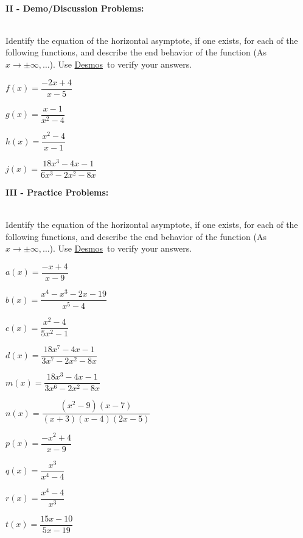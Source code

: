 \documentclass[12pt]{article}
\theoremstyle{definition}
\newcommand{\Desmos}{\href{https://www.desmos.com/}{Desmos}}
\begin{document}
\ \par
{\bf II - Demo/Discussion Problems:}\\
\ \par
Identify the equation of the horizontal asymptote, if one exists, for each of the following functions, and describe the end behavior of the function (As $x\rightarrow\pm\infty,\ldots$).  Use \Desmos \ to verify your answers.
\begin{enumerate}
\begin{multicols}{2}
\item $f(x)=\dfrac{-2x+4}{x-5}$
\item $g(x)=\dfrac{x-1}{x^2-4}$
\item $h(x)=\dfrac{x^2-4}{x-1}$
\item $j(x)=\dfrac{18x^3-4x-1}{6x^3-2x^2-8x}$
\end{multicols}
\end{enumerate}
\newpage
{\bf III - Practice Problems:}\\
\ \par
Identify the equation of the horizontal asymptote, if one exists, for each of the following functions, and describe the end behavior of the function (As $x\rightarrow\pm\infty,\ldots$).  Use \Desmos \ to verify your answers.
\begin{enumerate}
\begin{multicols}{2}
\item $a(x)=\dfrac{-x+4}{x-9}$
\item $b(x)=\dfrac{x^4-x^3-2x-19}{x^5-4}$
\item $c(x)=\dfrac{x^2-4}{5x^2-1}$
\item $d(x)=\dfrac{18x^7-4x-1}{3x^7-2x^2-8x}$
\item $m(x)=\dfrac{18x^3-4x-1}{3x^6-2x^2-8x}$
\item $n(x)=\dfrac{(x^2-9)(x-7)}{(x+3)(x-4)(2x-5)}$
\item $p(x)=\dfrac{-x^2+4}{x-9}$
\item $q(x)=\dfrac{x^3}{x^4-4}$
\item $r(x)=\dfrac{x^4-4}{x^3}$
\item $t(x)=\dfrac{15x-10}{5x-19}$
\end{multicols}
\end{enumerate}
\newpage
\ \newpage
\end{document}

